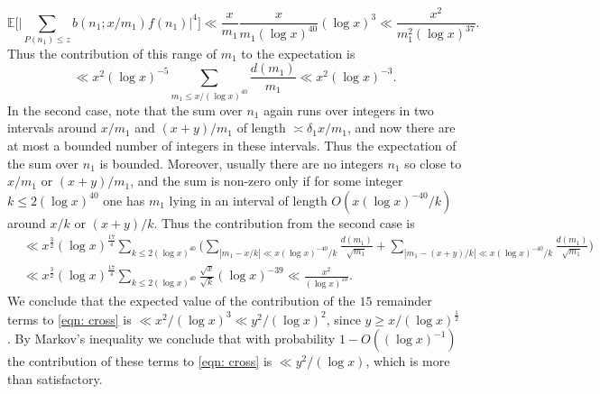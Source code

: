 \documentclass[12pt, notitlepage]{amsart}
\numberwithin{equation}{section}
\def\E{\mathbb E}
\theoremstyle{remark}
\theoremstyle{definition}
\theoremstyle{remark}
\numberwithin{equation}{section}
\begin{document}
$$
 \E \Big[ \Big| \sum_{P(n_1)\le z} b(n_1;x/m_1) f(n_1)\Big|^4\Big] \ll \frac{x}{m_1} \frac{x}{m_1(\log x)^{40} }(\log x)^3 \ll \frac{x^2}{m_1^2 (\log x)^{37}}. 
 $$ 
 Thus the contribution of this range of $m_1$ to the expectation is 
 $$ 
 \ll x^2 (\log x)^{-5}  \sum_{m_1 \le x/(\log x)^{40}} \frac{d(m_1)}{m_1} \ll x^2 (\log x)^{-3}.
 $$ 
 In the second case, note that the sum over $n_1$ again runs over integers in two intervals around $x/m_1$ and $(x+y)/m_1$ of length $\asymp \delta_1 x/m_1$, and now there are at most a bounded number of integers in these intervals.   Thus the expectation of the sum over $n_1$ is bounded.   Moreover, usually there are no integers $n_1$ so close to $x/m_1$ or $(x+y)/m_1$, and the sum is non-zero only if for some integer $k\le 2(\log x)^{40}$ one has $m_1$ lying in an interval of length $O(x(\log x)^{-40}/k)$ around $x/k$ or $(x+y)/k$.  Thus the contribution from the second case is 
 \begin{align*} 
& \ll x^{\frac 32} (\log x)^{\frac{17}{4}} \sum_{k\le 2(\log x)^{40}} \Big( \sum_{|m_1 -x/k| \ll x(\log x)^{-40}/k} \frac{d(m_1)}{\sqrt{m_1}} + \sum_{|m_1-(x+y)/k| \ll x(\log x)^{-40}/k} 
 \frac{d(m_1)}{\sqrt{m_1}} \Big) 
 \\
 &\ll  x^{\frac 32} (\log x)^{\frac{17}{4}} \sum_{k\le 2(\log x)^{40}} \frac{\sqrt{x}}{\sqrt{k}} (\log x)^{-39} \ll \frac{x^2}{(\log x)^{10}}. 
 \end{align*}
 We conclude that the expected value of the contribution of the $15$ remainder terms to \eqref{eqn: cross} is $\ll x^2/(\log x)^3 \ll y^2/(\log x)^2$, since $y \ge x/(\log x)^{\frac 12}$.  
 By Markov's inequality we conclude that with probability $1- O((\log x)^{-1})$ the contribution of these terms to \eqref{eqn: cross} is $\ll y^2/(\log x)$, which is more than satisfactory.  
 
\end{document}
